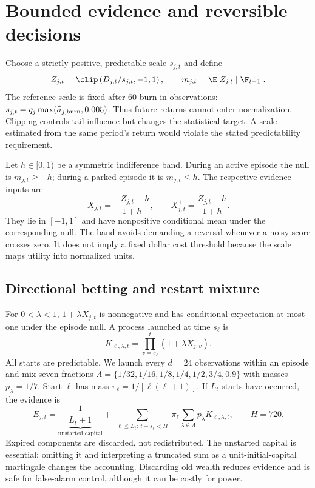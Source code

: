 \section{Bounded evidence and reversible decisions}\label{sec:method}
Choose a strictly positive, predictable scale $s_{j,t}$ and define
\begin{equation}\label{eq:score}
 Z_{j,t}=\clip\left(D_{j,t}/s_{j,t},-1,1\right),\qquad
 m_{j,t}=\E[Z_{j,t}\mid\F_{t-1}].
\end{equation}
The reference scale is fixed after 60 burn-in observations:
$s_{j,t}=q_j\max(\widehat\sigma_{j,\rm burn},0.005)$.
Thus future returns cannot enter normalization. Clipping controls tail influence but changes the statistical target. A scale estimated from the same period's return would violate the stated predictability requirement.

Let $h\in[0,1)$ be a symmetric indifference band. During an active episode the null is $m_{j,t}\ge-h$; during a parked episode it is $m_{j,t}\le h$. The respective evidence inputs are
\begin{equation}\label{eq:input}
 X^-_{j,t}=\frac{-Z_{j,t}-h}{1+h},\qquad
 X^+_{j,t}=\frac{Z_{j,t}-h}{1+h}.
\end{equation}
They lie in $[-1,1]$ and have nonpositive conditional mean under the corresponding null. The band avoids demanding a reversal whenever a noisy score crosses zero. It does not imply a fixed dollar cost threshold because the scale maps utility into normalized units.

\subsection{Directional betting and restart mixture}
For $0<\lambda<1$, $1+\lambda X_{j,t}$ is nonnegative and has conditional expectation at most one under the episode null. A process launched at time $s_\ell$ is
\begin{equation}
 K_{\ell,\lambda,t}=\prod_{v=s_\ell}^{t}(1+\lambda X_{j,v}).
\end{equation}
All starts are predictable. We launch every $d=24$ observations within an episode and mix seven fractions
$\Lambda=\{1/32,1/16,1/8,1/4,1/2,3/4,0.9\}$ with masses $p_\lambda=1/7$.
Start $\ell$ has mass $\pi_\ell=1/[\ell(\ell+1)]$. If $L_t$ starts have occurred, the evidence is
\begin{equation}\label{eq:mixture}
 E_{j,t}=\underbrace{\frac{1}{L_t+1}}_{\text{unstarted capital}}
 +\sum_{\substack{\ell\le L_t:\ t-s_\ell<H}}
       \pi_\ell\sum_{\lambda\in\Lambda}p_\lambda K_{\ell,\lambda,t},
 \qquad H=720.
\end{equation}
Expired components are discarded, not redistributed. The unstarted capital is essential: omitting it and interpreting a truncated sum as a unit-initial-capital martingale changes the accounting. Discarding old wealth reduces evidence and is safe for false-alarm control, although it can be costly for power.

